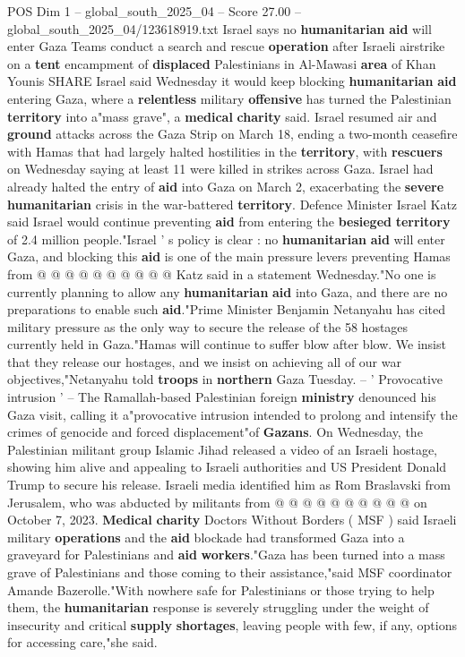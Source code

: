 \begin{textsample}{POS Dim 1 – global\_south\_2025\_04 – Score 27.00 – global\_south\_2025\_04/123618919.txt}  \label{ex:f1_pos_288}
Israel says no \textbf{humanitarian} \textbf{aid} will enter Gaza Teams conduct a search and rescue \textbf{operation} after Israeli airstrike on a \textbf{tent} encampment of \textbf{displaced} Palestinians in Al-Mawasi \textbf{area} of Khan Younis SHARE Israel said Wednesday it would keep blocking \textbf{humanitarian} \textbf{aid} entering Gaza, where a \textbf{relentless} military \textbf{offensive} has turned the Palestinian \textbf{territory} into a"mass grave", a \textbf{medical} \textbf{charity} said.
Israel resumed air and \textbf{ground} attacks across the Gaza Strip on March 18, ending a two-month ceasefire with Hamas that had largely halted hostilities in the \textbf{territory}, with \textbf{rescuers} on Wednesday saying at least 11 were killed in strikes across Gaza.
Israel had already halted the entry of \textbf{aid} into Gaza on March 2, exacerbating the \textbf{severe} \textbf{humanitarian} crisis in the war-battered \textbf{territory}.
Defence Minister Israel Katz said Israel would continue preventing \textbf{aid} from entering the \textbf{besieged} \textbf{territory} of 2.4 million people."Israel ' s policy is clear : no \textbf{humanitarian} \textbf{aid} will enter Gaza, and blocking this \textbf{aid} is one of the main pressure levers preventing Hamas from @ @ @ @ @ @ @ @ @ @ Katz said in a statement Wednesday."No one is currently planning to allow any \textbf{humanitarian} \textbf{aid} into Gaza, and there are no preparations to enable such \textbf{aid}."Prime Minister Benjamin Netanyahu has cited military pressure as the only way to secure the release of the 58 hostages currently held in Gaza."Hamas will continue to suffer blow after blow.
We insist that they release our hostages, and we insist on achieving all of our war objectives,"Netanyahu told \textbf{troops} in \textbf{northern} Gaza Tuesday. -- ' Provocative intrusion ' -- The Ramallah-based Palestinian foreign \textbf{ministry} denounced his Gaza visit, calling it a"provocative intrusion intended to prolong and intensify the crimes of genocide and forced displacement"of \textbf{Gazans}.
On Wednesday, the Palestinian militant group Islamic Jihad released a video of an Israeli hostage, showing him alive and appealing to Israeli authorities and US President Donald Trump to secure his release.
Israeli media identified him as Rom Braslavski from Jerusalem, who was abducted by militants from @ @ @ @ @ @ @ @ @ @ on October 7, 2023. \textbf{Medical} \textbf{charity} Doctors Without Borders ( MSF ) said Israeli military \textbf{operations} and the \textbf{aid} blockade had transformed Gaza into a graveyard for Palestinians and \textbf{aid} \textbf{workers}."Gaza has been turned into a mass grave of Palestinians and those coming to their assistance,"said MSF coordinator Amande Bazerolle."With nowhere safe for Palestinians or those trying to help them, the \textbf{humanitarian} response is severely struggling under the weight of insecurity and critical \textbf{supply} \textbf{shortages}, leaving people with few, if any, options for accessing care,"she said.

\end{textsample}
